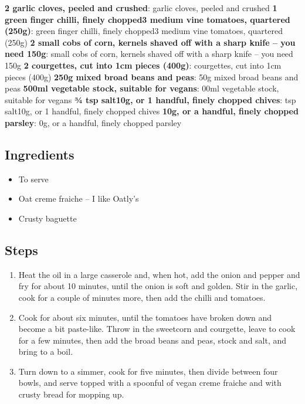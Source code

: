 \documentclass{book}
\begin{document}
\textbf{2 garlic cloves, peeled and crushed}:  garlic cloves, peeled and crushed
\textbf{1 green finger chilli, finely chopped3 medium vine tomatoes, quartered (250g)}:  green finger chilli, finely chopped3 medium vine tomatoes, quartered (250g)
\textbf{2 small cobs of corn, kernels shaved off with a sharp knife – you need 150g}:  small cobs of corn, kernels shaved off with a sharp knife – you need 150g
\textbf{2 courgettes, cut into 1cm pieces (400g)}:  courgettes, cut into 1cm pieces (400g)
\textbf{250g mixed broad beans and peas}: 50g mixed broad beans and peas
\textbf{500ml vegetable stock, suitable for vegans}: 00ml vegetable stock, suitable for vegans
\textbf{¾ tsp salt10g, or 1 handful, finely chopped chives}:  tsp salt10g, or 1 handful, finely chopped chives
\textbf{10g, or a handful, finely chopped parsley}: 0g, or a handful, finely chopped parsley
\subsection*{Ingredients}
\begin{itemize}
\item To serve
\item Oat creme fraiche – I like Oatly’s
\item Crusty baguette
\end{itemize}

\subsection*{Steps}
\begin{enumerate}
\item Heat the oil in a large casserole and, when hot, add the onion and pepper and fry for about 10 minutes, until the onion is soft and golden. Stir in the garlic, cook for a couple of minutes more, then add the chilli and tomatoes.
\item Cook for about six minutes, until the tomatoes have broken down and become a bit paste-like. Throw in the sweetcorn and courgette, leave to cook for a few minutes, then add the broad beans and peas, stock and salt, and bring to a boil.
\item Turn down to a simmer, cook for five minutes, then divide between four bowls, and serve topped with a spoonful of vegan creme fraiche and with crusty bread for mopping up.
\end{enumerate}
\newpage
\end{document}
